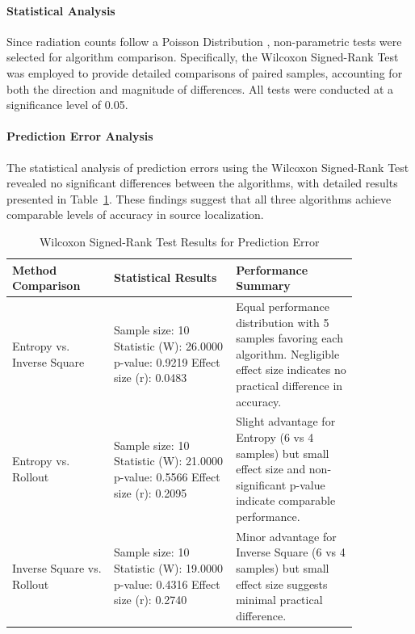 \documentclass[../report.tex]{subfiles}
\begin{document}
    

    \paragraph{Statistical Analysis}

    Since radiation counts follow a Poisson Distribution \cite{ristic2010information}, non-parametric tests were selected for algorithm comparison. Specifically, the Wilcoxon Signed-Rank Test was 
    employed to provide detailed comparisons of paired samples, accounting for both the direction and magnitude of differences. All tests were conducted at a significance level of 0.05.

    \paragraph{Prediction Error Analysis}
    The statistical analysis of prediction errors using the Wilcoxon Signed-Rank Test revealed no significant differences between the algorithms, with detailed results presented in Table~\ref{tab:wilcoxon_prediction_results}. These findings suggest that all three algorithms achieve comparable levels of accuracy in source localization.
    \begin{table}[ht]
        \caption{Wilcoxon Signed-Rank Test Results for Prediction Error}
        \label{tab:wilcoxon_prediction_results}
        \centering
        \begin{tabular}{|p{0.25\linewidth}|p{0.3\linewidth}|p{0.3\linewidth}|}
        \hline
        \rowcolor{gray!10} 
        Method Comparison & Statistical Results & Performance Summary \\
        \hline
        Entropy vs. Inverse Square & 
        Sample size: 10 \newline
        Statistic (W): 26.0000 \newline
        p-value: 0.9219 \newline
        Effect size (r): 0.0483 & 
        Equal performance distribution with 5 samples favoring each algorithm. Negligible effect size indicates no practical difference in accuracy. \\
        \hline
        Entropy vs. Rollout & 
        Sample size: 10 \newline
        Statistic (W): 21.0000 \newline
        p-value: 0.5566 \newline
        Effect size (r): 0.2095 & 
        Slight advantage for Entropy (6 vs 4 samples) but small effect size and non-significant p-value indicate comparable performance. \\
        \hline
        Inverse Square vs. Rollout & 
        Sample size: 10 \newline
        Statistic (W): 19.0000 \newline
        p-value: 0.4316 \newline
        Effect size (r): 0.2740 & 
        Minor advantage for Inverse Square (6 vs 4 samples) but small effect size suggests minimal practical difference. \\
        \hline
        \end{tabular}
    \end{table}
\end{document}
